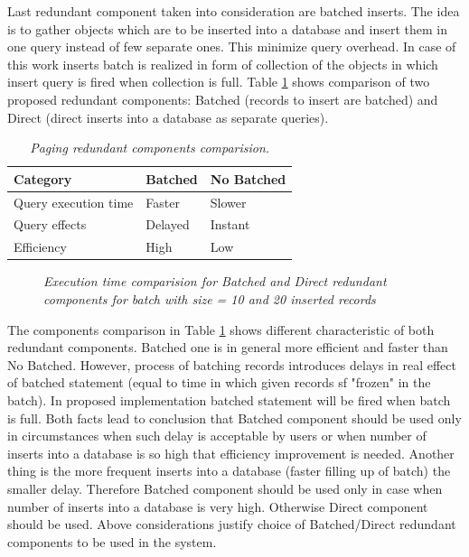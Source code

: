 \documentclass[10pt,a4paper]{article}
\begin{document}
Last redundant component taken into consideration are batched inserts. The idea is to gather objects which are to be inserted into a database and insert them in one query instead of few separate ones. This minimize query overhead. In case of this work inserts batch is realized in form of collection of the objects in which insert query is fired when collection is full.   
Table \ref{batchedcomponents} shows comparison of two proposed redundant components: Batched (records to insert are batched) and Direct (direct inserts into a database as separate queries).

\begin{table}[!htb]
\def\arraystretch{1.5}
\caption{\textit{Paging redundant components comparision.}}\label{batchedcomponents}
\begin{tabularx}{\textwidth}{p{3cm}|X|X}
  \textbf{Category} &\textbf{Batched} & \textbf{No Batched} \\
\hline
Query execution time & Faster & Slower \\
Query effects & Delayed & Instant\\
Efficiency & High & Low\\
\end{tabularx}
\end{table}

\begin{figure}[!htb]
\centering
{}
\caption{\textit{Execution time comparision for Batched and Direct redundant components for batch with size = 10 and 20 inserted records}} \label{fig:batchedtime}
\end{figure}

The components comparison in Table \ref{batchedcomponents} shows different characteristic of both redundant components. Batched one is in general more efficient and faster than No Batched. However, process of batching records introduces delays in real effect of batched statement (equal to time in which given records sf "frozen" in the batch). In proposed implementation batched statement will be fired when batch is full. Both facts lead to conclusion that Batched component should be used only in circumstances when such delay is acceptable by users or when number of inserts into a database is so high that efficiency improvement is needed. Another thing is the more frequent inserts into a database (faster filling up of batch) the smaller delay. Therefore Batched component should be used only in case when number of inserts into a database is very high. Otherwise Direct component should be used. Above considerations justify choice of Batched/Direct redundant components to be used in the system.   
\end{document}
